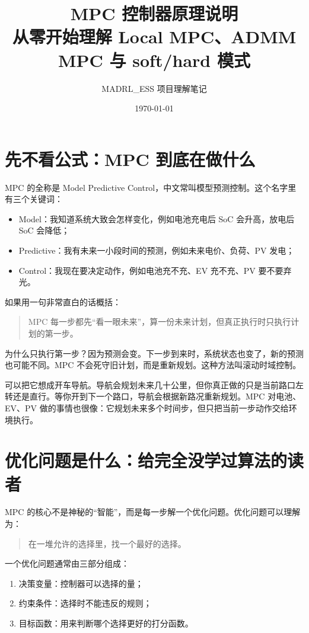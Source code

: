 \documentclass[UTF8,zihao=-4]{ctexart}
\title{MPC 控制器原理说明\\{\large 从零开始理解 Local MPC、ADMM MPC 与 soft/hard 模式}}
\author{MADRL\_ESS 项目理解笔记}
\date{\today}
\begin{document}
\maketitle
\tableofcontents
\newpage

\section{先不看公式：MPC 到底在做什么}

MPC 的全称是 Model Predictive Control，中文常叫模型预测控制。这个名字里有三个关键词：
\begin{itemize}
  \item Model：我知道系统大致会怎样变化，例如电池充电后 SoC 会升高，放电后 SoC 会降低；
  \item Predictive：我有未来一小段时间的预测，例如未来电价、负荷、PV 发电；
  \item Control：我现在要决定动作，例如电池充不充、EV 充不充、PV 要不要弃光。
\end{itemize}

如果用一句非常直白的话概括：
\begin{quote}
MPC 每一步都先“看一眼未来”，算一份未来计划，但真正执行时只执行计划的第一步。
\end{quote}

为什么只执行第一步？因为预测会变。下一步到来时，系统状态也变了，新的预测也可能不同。MPC 不会死守旧计划，而是重新规划。这种方法叫滚动时域控制。

可以把它想成开车导航。导航会规划未来几十公里，但你真正做的只是当前路口左转还是直行。等你开到下一个路口，导航会根据新路况重新规划。MPC 对电池、EV、PV 做的事情也很像：它规划未来多个时间步，但只把当前一步动作交给环境执行。

\section{优化问题是什么：给完全没学过算法的读者}

MPC 的核心不是神秘的“智能”，而是每一步解一个优化问题。优化问题可以理解为：
\begin{quote}
在一堆允许的选择里，找一个最好的选择。
\end{quote}

一个优化问题通常由三部分组成：
\begin{enumerate}
  \item 决策变量：控制器可以选择的量；
  \item 约束条件：选择时不能违反的规则；
  \item 目标函数：用来判断哪个选择更好的打分函数。
\end{enumerate}
\end{document}
